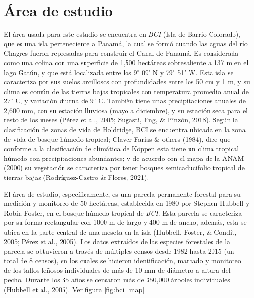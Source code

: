\documentclass[11pt,]{article}
\begin{document}
\section{Área de estudio}\label{uxe1rea-de-estudio}

El área usada para este estudio se encuentra en \emph{BCI} (Isla de
Barrio Colorado), que es una isla perteneciente a Panamá, la cual se
formó cuando las aguas del río Chagres fueron represadas para construir
el Canal de Panamá. Es considerada como una colina con una superficie de
1,500 hectáreas sobresaliente a 137 m en el lago Gatún, y que está
localizada entre los 9\(^\circ\) 09' N y 79\(^\circ\) 51' W. Esta isla
se caracteriza por sus suelos arcillosos con profundidades entre los 50
cm y 1 m, y su clima es común de las tierras bajas tropicales con
temperatura promedio anual de 27\(^\circ\) C, y variación diurna de
9\(^\circ\) C. También tiene unas precipitaciones anuales de 2,600 mm,
con su estación lluviosa (mayo a diciembre), y su estación seca para el
resto de los meses (Pérez et al., 2005; Sugasti, Eng, \& Pinzón, 2018).
Según la clasificación de zonas de vida de Holdridge, BCI se encuentra
ubicada en la zona de vida de bosque húmedo tropical; Claver Farías \&
others (1984), dice que conforme a la clasificación de climática de
Köppen esta tiene un clima tropical húmedo con precipitaciones
abundantes; y de acuerdo con el mapa de la ANAM (2000) su vegetación se
caracteriza por tener bosques semicaducifolio tropical de tierras bajas
(Rodríguez-Castro \& Flores, 2021).

El área de estudio, específicamente, es una parcela permanente forestal
para su medición y monitoreo de 50 hectáreas, establecida en 1980 por
Stephen Hubbell y Robin Foster, en el bosque húmedo tropical de
\emph{BCI}. Esta parcela se caracteriza por su forma rectangular con
1000 m de largo y 400 m de ancho, además, esta se ubica en la parte
central de una meseta en la isla (Hubbell, Foster, \& Condit, 2005;
Pérez et al., 2005). Los datos extraídos de las especies forestales de
la parcela se obtuvieron a través de múltiples censos desde 1982 hasta
2015 (un total de 8 censos), en los cuales se hicieron identificación,
marcado y monitoreo de los tallos leñosos individuales de más de 10 mm
de diámetro a altura del pecho. Durante los 35 años se censaron más de
350,000 árboles individuales (Hubbell et al., 2005). Ver figura
\ref{fig:bci_map}
\end{document}
